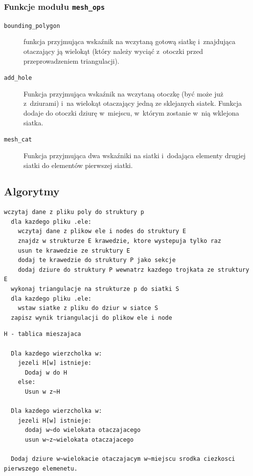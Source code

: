 \documentclass[a4paper]{article}
\begin{document}
\subsubsection{Funkcje modułu \texttt{mesh\_ops}}
\begin{description}
  \item[\texttt{bounding\_polygon}] funkcja przyjmująca wskaźnik na wczytaną gotową siatkę i~znajdująca otaczający ją wielokąt (który należy wyciąć z~otoczki przed przeprowadzeniem triangulacji).
  \item[\texttt{add\_hole}] Funkcja przyjmująca wskaźnik na wczytaną otoczkę (być może już z~dziurami) i~na wielokąt otaczający jedną ze sklejanych siatek. Funkcja dodaje do otoczki dziurę w~miejscu, w~którym zostanie w~nią wklejona siatka.
  \item[\texttt{mesh\_cat}] Funkcja przyjmująca dwa wskaźniki na siatki i~dodająca elementy drugiej siatki do elementów pierwszej siatki.
\end{description}

\subsection{Algorytmy}
\begin{lstlisting}[caption=Pseudokod algorytmu głównej funkcji programu sklejającej siatki]
  wczytaj dane z pliku poly do struktury p
  dla kazdego pliku .ele:
    wczytaj dane z plikow ele i nodes do struktury E
    znajdz w strukturze E krawedzie, ktore wystepuja tylko raz
    usun te krawedzie ze struktury E
    dodaj te krawedzie do struktury P jako sekcje
    dodaj dziure do struktury P wewnatrz kazdego trojkata ze struktury E
  wykonaj triangulacje na strukturze p do siatki S
  dla kazdego pliku .ele:
    wstaw siatke z pliku do dziur w siatce S
  zapisz wynik triangulacji do plikow ele i node
\end{lstlisting}

\begin{lstlisting}[caption=Pseudokod funkcji szukającej wielokąta otaczającego daną siatkę: \texttt{bounding\_polygon}]
  H - tablica mieszajaca

  Dla kazdego wierzcholka w:
    jezeli H[w] istnieje:
      Dodaj w do H
    else:
      Usun w z~H

  Dla kazdego wierzcholka w:
    jezeli H[w] istnieje:
      dodaj w~do wielokata otaczajacego
      usun w~z~wielokata otaczajacego

  Dodaj dziure w~wielokacie otaczajacym w~miejscu srodka ciezkosci pierwszego elemenetu.

\end{lstlisting}
\end{document}
